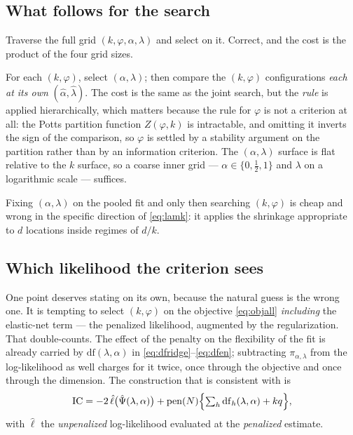 \documentclass[11pt,a4paper]{article}
\begin{document}
\subsection{What follows for the search}

\begin{description}[leftmargin=1.2em,itemsep=3pt,topsep=3pt]
  \item[\textbf{Joint.}] Traverse the full grid
    $(k,\varphi,\alpha,\lambda)$ and select on it. Correct, and the cost is the
    product of the four grid sizes.
  \item[\textbf{Profiled, and what we recommend.}] For each $(k,\varphi)$,
    select $(\alpha,\lambda)$; then compare the $(k,\varphi)$ configurations
    \emph{each at its own} $(\hat\alpha,\hat\lambda)$. The cost is the same as
    the joint search, but the \emph{rule} is applied hierarchically, which
    matters because the rule for $\varphi$ is not a criterion at all: the Potts
    partition function $Z(\varphi,k)$ is intractable, and omitting it inverts
    the sign of the comparison, so $\varphi$ is settled by a stability argument
    on the partition rather than by an information criterion. The
    $(\alpha,\lambda)$ surface is flat relative to the $k$ surface, so a coarse
    inner grid --- $\alpha \in \{0,\tfrac12,1\}$ and $\lambda$ on a logarithmic
    scale --- suffices.
  \item[\textbf{Sequential, and why not.}] Fixing $(\alpha,\lambda)$ on the
    pooled fit and only then searching $(k,\varphi)$ is cheap and wrong in the
    specific direction of \eqref{eq:lamk}: it applies the shrinkage appropriate
    to $d$ locations inside regimes of $d/k$.
\end{description}

\subsection{Which likelihood the criterion sees}

One point deserves stating on its own, because the natural guess is the wrong
one. It is tempting to select $(k,\varphi)$ on the objective
\eqref{eq:objall} \emph{including} the elastic-net term --- the penalized
likelihood, augmented by the regularization. That double-counts. The effect of
the penalty on the flexibility of the fit is already carried by
$\mathrm{df}(\lambda,\alpha)$ in
\eqref{eq:dfridge}--\eqref{eq:dfen}; subtracting $\pi_{\alpha,\lambda}$ from
the log-likelihood as well charges for it twice, once through the objective and
once through the dimension. The construction that is consistent with
\citet{ZouHastieTibshirani2007} is
\begin{equation}
  \mathrm{IC} = -2\,\hat\ell\bigl(\hat\Psi(\lambda,\alpha)\bigr)
    + \mathrm{pen}(N)\Bigl\{ \textstyle\sum_h \mathrm{df}_h(\lambda,\alpha) + kq \Bigr\},
  \label{eq:icfinal}
\end{equation}
with $\hat\ell$ the \emph{unpenalized} log-likelihood evaluated at the
\emph{penalized} estimate.
\end{document}
